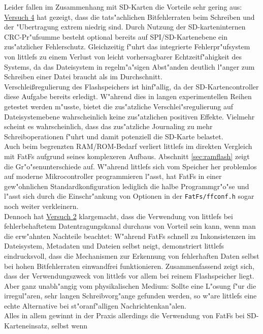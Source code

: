 \documentclass[11pt]{article}
\begin{document}
Leider fallen im Zusammenhang mit SD-Karten die Vorteile sehr gering aus:
\hyperref[sec:v4]{Versuch 4} hat gezeigt, dass die tats"achlichen Bitfehlerraten beim Schreiben und
der "Ubertragung extrem niedrig sind. Durch Nutzung der SD-karteninternen CRC-Pr"ufsumme besteht optional 
bereits auf SPI/SD-Kartenebene ein zus"atzlicher Fehlerschutz.
Gleichzeitig f"uhrt das integrierte Fehlerpr"ufsystem von littlefs zu
einem Verlust von leicht vorhersagbarer Echtzeitf"ahigkeit des Systems, da das
Dateisystem in regelm"a"sigen Abst"anden deutlich l"anger zum Schreiben einer Datei braucht
als im Durchschnitt. \\
Verschleißregulierung des Flashspeichers ist hinf"allig, da der SD-Kartencontroller diese Aufgabe
bereits erledigt. W"ahrend dies in langen experimentellen Reihen getestet werden m"usste, bietet
die zus"atzliche Verschlei"sregulierung auf Dateisystemebene wahrscheinlich keine zus"atzlichen
positiven Effekte. Vielmehr scheint es wahrscheinlich, dass das zus"atzliche Journaling zu mehr
Schreiboperationen f"uhrt und damit potenziell die SD-Karte belastet. \\
Auch beim begrenzten RAM/ROM-Bedarf verliert littlefs im direkten Vergleich mit FatFs aufgrund seines 
komplexeren Aufbaus. Abschnitt \ref{sec:ramflash} zeigt die Gr"o"senunterschiede auf. W"ahrend 
littlefs sich vom Speicher her problemlos auf moderne Mikrocontroller programmieren l"asst, 
hat FatFs in einer gew"ohnlichen Standardkonfiguration lediglich die halbe Programmgr"o"se und l"asst
sich durch die Einschr"ankung von Optionen in der \texttt{FatFs/ffconf.h} sogar noch weiter verkleinern.\\
Dennoch hat \hyperref[sec:v2]{Versuch 2} klargemacht, dass die Verwendung von littlefs bei fehlerbehaftetem 
Datentragungskanal durchaus von Vorteil sein kann, wenn man die erw"ahnten Nachteile beachtet:
W"ahrend FatFs schnell zu Inkonsistenzen im Dateisystem, Metadaten und Dateien selbst neigt, demonstriert
littlefs eindrucksvoll, dass die Mechanismen zur Erkennung von fehlerhaften Daten selbst bei 
hohen Bitfehlerraten einwandfrei funktionieren.
Zusammenfassend zeigt sich, dass der Verwendungszweck von littlefs vor allem bei reinem Flashspeicher liegt. 
Aber ganz unabh"angig vom physikalischen Medium:
Sollte eine L"osung f"ur die irregul"aren, sehr langen Schreibvorg"ange gefunden werden,
so w"are littlefs eine echte Alternative bei st"oranf"alligen Nachrichtenkan"alen. \\
Alles in allem gewinnt in der Praxis allerdings die Verwendung von FatFs bei SD-Karteneinsatz, selbst wenn 
\end{document}
